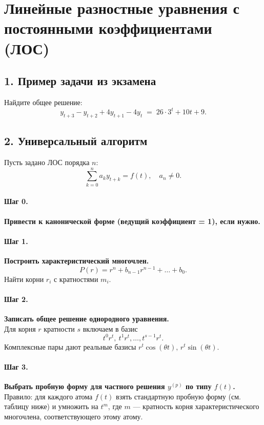 \section{Линейные разностные уравнения с постоянными коэффициентами (ЛОС)}

\subsection*{1. Пример задачи из экзамена}
Найдите общее решение:
\[
y_{t+3}-y_{t+2}+4y_{t+1}-4y_{t} \;=\; 26\cdot 3^{t} + 10t + 9.
\]

\subsection*{2. Универсальный алгоритм}
Пусть задано ЛОС порядка \(n\):
\[
\sum_{k=0}^{n} a_k y_{t+k} = f(t), \quad a_n\neq0.
\]

\paragraph{Шаг 0.} \textbf{Привести к канонической форме (ведущий коэффициент = 1), если нужно.}

\paragraph{Шаг 1.} \textbf{Построить характеристический многочлен.}
\[
P(r)=r^{n}+b_{n-1}r^{n-1}+\dots+b_0.
\]
Найти корни \(r_i\) с кратностями \(m_i\).

\paragraph{Шаг 2.} \textbf{Записать общее решение однородного уравнения.}\\
Для корня \(r\) кратности \(s\) включаем в базис
\[
t^{0}r^{t},\ t^{1}r^{t},\dots,t^{s-1}r^{t}.
\]
Комплексные пары дают реальные базисы \(r^{t}\cos(\theta t),\, r^{t}\sin(\theta t)\).

\paragraph{Шаг 3.} \textbf{Выбрать пробную форму для частного решения \(y^{(p)}\) по типу \(f(t)\).}\\
Правило: для каждого атома \(f(t)\) взять стандартную пробную форму (см. таблицу ниже) и умножить на \(t^{m}\), где \(m\) — кратность корня характеристического многочлена, соответствующего этому атому.

